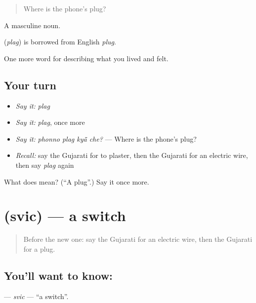 \begin{quote}
Where is the phone's plug?
\end{quote}

A masculine noun.

\begin{cousinweb}
\textbf{} (\emph{plag}) is borrowed from English \emph{plug}.
\end{cousinweb}

\begin{grammarlens}[title={What you've built}]
One more word for describing what you lived and felt.
\end{grammarlens}

\subsection*{Your turn}
\begin{itemize}
\raggedright
  \item \emph{Say it:} \emph{plag}
  \item \emph{Say it:} \emph{plag}, once more
  \item \emph{Say it:} \emph{phonno plag kyā̃ che?} — Where is the phone's plug?
  \item \emph{Recall:} say the Gujarati for to plaster, then the Gujarati for an electric wire, then say \emph{plag} again
\end{itemize}

\begin{tcolorbox}[breakable,colback=teal!4,colframe=teal!35!black,title={Before you move on}]
What does  mean? (\textquotedblleft{}A plug\textquotedblright{}.) Say it once more.
\end{tcolorbox}
\section[\texorpdfstring{\gu{સ્વિચ} (svic)}{સ્વિચ (svic)}]{ (svic) — a switch}

\label{lesson:GU-C517-svic}



\begin{quote}
Before the new one: say the Gujarati for an electric wire, then the Gujarati for a plug.
\end{quote}

\subsection*{You'll want to know: }
\textbf{} — \emph{svic} — \textquotedblleft{}a switch\textquotedblright{}.

